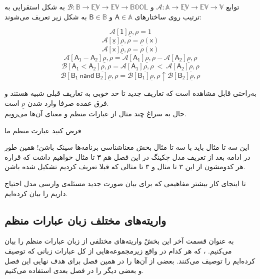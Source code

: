\begin{defn}
	توابع 
	$\mathcal{A}:\mathbb{A}\rightarrow \mathbb{\underline{EV}} \rightarrow
	\mathbb{EV} \rightarrow \mathbb{V}$
	و 
	$\mathcal{B}:\mathbb{B}\rightarrow \mathbb{\underline{EV}} \rightarrow
	\mathbb{EV} \rightarrow \mathbb{BOOL}$
	به شکل استقرایی به ترتیب روی ساختارهای 
	$\mathsf{A}\in\mathbb{A}$
	و
	$\mathsf{B} \in \mathbb{B}$
	به شکل زیر تعریف می‌شوند:
	
	
$$\mathcal{A}[\mathsf{1}]\underline{\rho},\rho=1$$
$$\mathcal{A}[\mathsf{\underline{\mathsf{x}}}]\underline{\rho},\rho= \underline{\rho}(\mathsf{x})$$
$$\mathcal{A}[\mathsf{\mathsf{x}}]\underline{\rho},\rho= \rho(\mathsf{x})$$
$$\mathcal{A}[\mathsf{A_1 - A_2}]\underline{\rho},\rho= 
\mathcal{A}[\mathsf{A_1}]\underline{\rho},\rho - \mathcal{A}[\mathsf{A_2}]\underline{\rho},\rho$$
$$\mathcal{B}[\mathsf{A_1 < A_2}]\underline{\rho},\rho=
	\mathcal{A}[\mathsf{A_1}]\underline{\rho},\rho\: <\: \mathcal{A}[\mathsf{A_2}]\underline{\rho},\rho$$
$$\mathcal{B}[\mathsf{B_1\:nand\:B_2}]\underline{\rho},\rho=
\mathcal{B}[\mathsf{B_1}]\underline{\rho},\rho \uparrow 
\mathcal{B}[\mathsf{B_2}]\underline{\rho},\rho $$
\end{defn}
به‌راحتی قابل مشاهده است که تعاریف جدید تا حد خوبی به تعاریف قبلی شبیه هستند و فرق عمده صرفا وارد شدن $\underline{\rho}$ است.\\
حال به سراغ چند مثال از عبارات منظم و معنای آن‌ها می‌رویم.
\begin{exm}
	فرض کنید عبارت منظم ما

\end{exm}

\begin{exm}
	
	{این سه تا مثال باید با سه تا مثال بخش معناشناسی برنامه‌ها سینک باشن! همین طور در ادامه بعد از تعریف مدل چکینگ در این فصل هم ۳ تا مثال خواهیم داشت که قراره هر کدومشون از این ۳ تا مثال و ۳ تا مثالی که قبلا تعریف کردیم تشکیل شده باشن.}
\end{exm}

\begin{exm}
	
\end{exm}

تا اینجای کار بیشتر مفاهیمی که برای بیان صورت جدید مسئله‌ی وارسی مدل احتیاج داریم را بیان کرده‌ایم. 
\subsection{واریته‌های مختلف زبان عبارات منظم}
به عنوان قسمت آخر این بخشْ واریته‌های مختلفی از زبان عبارات منظم را بیان می‌کنیم. ، که هر کدام در واقع زیرمجموعه‌هایی از کل عبارات زبانی که توصیف کرده‌ایم را توصیف می‌کنند. بعضی از آن‌ها را در همین فصل برای هدف نهایی این فصل و بعضی دیگر را در فصل بعدی استفاده می‌کنیم.

